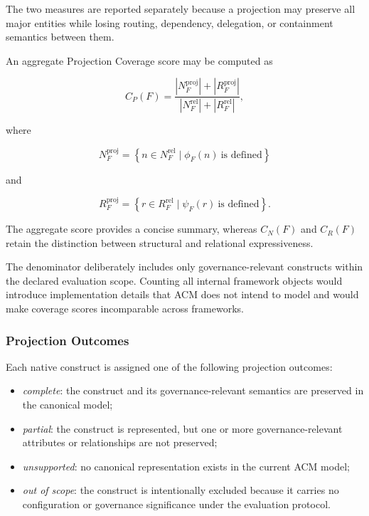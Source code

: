 \documentclass[10pt]{article}
\begin{document}
The two measures are reported separately because a projection may preserve all
major entities while losing routing, dependency, delegation, or containment
semantics between them.

An aggregate Projection Coverage score may be computed as

\begin{equation}
C_P(F)
=
\frac{
	|N_F^{\mathrm{proj}}|
	+
	|R_F^{\mathrm{proj}}|
}{
	|N_F^{\mathrm{rel}}|
	+
	|R_F^{\mathrm{rel}}|
},
\label{eq:agg_projection_converage}
\end{equation}

where

\[
N_F^{\mathrm{proj}}
=
\left\{
n\in N_F^{\mathrm{rel}}
\mid
\phi_F(n)\ \text{is defined}
\right\}
\]

and

\[
R_F^{\mathrm{proj}}
=
\left\{
r\in R_F^{\mathrm{rel}}
\mid
\psi_F(r)\ \text{is defined}
\right\}.
\]

The aggregate score provides a concise summary, whereas $C_N(F)$ and $C_R(F)$
retain the distinction between structural and relational expressiveness.

The denominator deliberately includes only governance-relevant constructs
within the declared evaluation scope. Counting all internal framework objects
would introduce implementation details that ACM does not intend to model and
would make coverage scores incomparable across frameworks.

\subsubsection{Projection Outcomes}

Each native construct is assigned one of the following projection outcomes:

\begin{itemize}
	\item \emph{complete}: the construct and its governance-relevant semantics
	are preserved in the canonical model;
	\item \emph{partial}: the construct is represented, but one or more
	governance-relevant attributes or relationships are not preserved;
	\item \emph{unsupported}: no canonical representation exists in the current
	ACM model;
	\item \emph{out of scope}: the construct is intentionally excluded because
	it carries no configuration or governance significance under the evaluation
	protocol.
\end{itemize}
\end{document}
